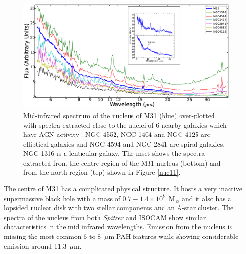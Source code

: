 \begin{figure}
\centering
\includegraphics[height = 8 cm]{./SINGSspec.eps}
\caption{Mid-infrared spectrum of the nucleus of M31 (blue) over-plotted with spectra extracted close to the nuclei of 6 nearby galaxies which have 
AGN activity \citep{Smith:2007lr}. NGC 4552, NGC 1404 and NGC 4125 are elliptical galaxies and NGC 4594 and NGC 2841 are spiral galaxies. 
NGC 1316 is a lenticular galaxy. The inset shows the spectra extracted from the centre region of the M31 nucleus (bottom) and from the north region (top) 
shown in Figure \ref{nuc11}.}
\label{smithspec}
\end{figure}

The centre of M31 has a complicated physical structure. It hosts a very inactive supermassive black hole with a mass of 
$0.7-1.4 \times 10^8$~M$_{\sun}$ \citep{Bacon2001} and it also has a lopsided nuclear disk \citep{Lauer1993} with two stellar components and an A-star cluster. 
The spectra of the nucleus from both {\em Spitzer} and ISOCAM show similar characteristics in the mid infrared wavelengths. 
Emission from the nucleus is missing the most common 6 to 8~$\mu$m PAH features while showing considerable emission around 11.3~$\mu$m. 

